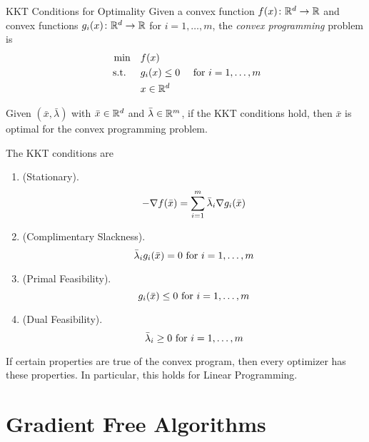 \documentclass[../open-optimization/open-optimization.tex]{subfiles}
\begin{document}
\begin{general}{KKT Conditions for Optimality}{}
Given a convex function $f(x)\colon {\mathbb{R}}^d \to {\mathbb{R}}$ and convex functions $g_i(x)\colon {\mathbb{R}}^d \to {\mathbb{R}}$ for $i=1, \dots, m$,  the \emph{convex programming} problem is
\begin{equation}
\label{eq:convex-programming-KKT}
\begin{split}
\min \quad & f(x)\\
\text{ s.t. }  \quad & g_i(x) \leq 0  \quad  \text{ for } i=1, \dots, m\\
& x \in {\mathbb{R}}^d
\end{split}
\end{equation}

Given $(\bar x, \bar \lambda)$ with $\bar x \in {\mathbb{R}}^d$ and $\bar \lambda \in {\mathbb{R}}^m$, if the KKT conditions hold, then $\bar x$ is optimal for the convex programming problem.  

The KKT conditions are
\begin{enumerate}
\item (Stationary).   
\begin{equation}
- \nabla f(\bar x) = \sum_{i=1}^m \bar \lambda_i \nabla g_i(\bar x)\\
\end{equation}
\item (Complimentary Slackness).   
\begin{equation}
 \bar \lambda_i  g_i(\bar x) = 0 \text{ for } i=1, \dots, m\\
\end{equation}
\item (Primal Feasibility).   
\begin{equation}
  g_i(\bar x) \leq 0 \text{ for } i=1, \dots, m\\
\end{equation}
\item (Dual Feasibility).   
\begin{equation}
 \bar \lambda_i \geq 0 \text{ for } i=1, \dots, m\\
\end{equation}
\end{enumerate}
\end{general}

If certain properties are true of the convex program, then every optimizer has these properties.   In particular, this holds for Linear Programming.


\section{Gradient Free Algorithms}
\end{document}
